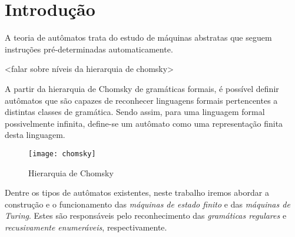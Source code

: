 \section{Introdução}

A teoria de autômatos trata do estudo de máquinas abstratas que seguem
instruções pré-determinadas automaticamente.

<falar sobre níveis da hierarquia de chomsky>

A partir da hierarquia de Chomsky de gramáticas formais, é possível definir
autômatos que são capazes de reconhecer linguagens formais pertencentes a
distintas classes de gramática. Sendo assim, para uma linguagem formal
possivelmente infinita, define-se um autômato como uma representação finita
desta linguagem.

\begin{figure}[H]
    \centering
    \texttt{[image: chomsky]}
    \label{chomsky}
    \caption{Hierarquia de Chomsky}
\end{figure}

Dentre os tipos de autômatos existentes, neste trabalho iremos abordar a
construção e o funcionamento das \emph{máquinas de estado finito} e das
\emph{máquinas de Turing}. Estes são responsáveis pelo reconhecimento das
\emph{gramáticas regulares } e \emph{recusivamente enumeráveis},
respectivamente.
